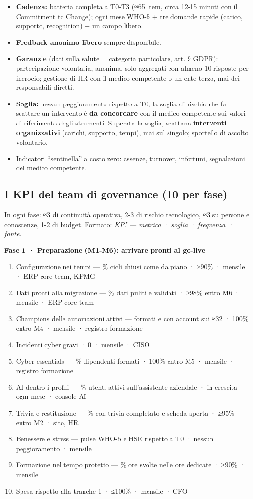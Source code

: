 \documentclass[11pt,a4paper]{article}
\begin{document}
\begin{itemize}
\item \textbf{Cadenza:} batteria completa a T0-T3 (≈65 item, circa 12-15 minuti con il Commitment to Change); ogni mese WHO-5 + tre domande rapide (carico, supporto, recognition) + un campo libero.
\item \textbf{Feedback anonimo libero} sempre disponibile.
\item \textbf{Garanzie} (dati sulla salute = categoria particolare, art. 9 GDPR): partecipazione volontaria, anonima, solo aggregati con almeno 10 risposte per incrocio; gestione di HR con il medico competente o un ente terzo, mai dei responsabili diretti.
\item \textbf{Soglia:} nessun peggioramento rispetto a T0; la soglia di rischio che fa scattare un intervento è \textbf{da concordare} con il medico competente sui valori di riferimento degli strumenti. Superata la soglia, scattano \textbf{interventi organizzativi} (carichi, supporto, tempi), mai sul singolo; sportello di ascolto volontario.
\item Indicatori ``sentinella'' a costo zero: assenze, turnover, infortuni, segnalazioni del medico competente.
\end{itemize}

\subsection{I KPI del team di governance (10 per fase)}\label{sec:16.4}
In ogni fase: ≈3 di continuità operativa, 2-3 di rischio tecnologico, ≈3 su persone e conoscenze, 1-2 di budget. Formato: \emph{KPI — metrica · soglia · frequenza · fonte}.

\textbf{Fase 1 · Preparazione (M1-M6): arrivare pronti al go-live}
\begin{enumerate}
\item Configurazione nei tempi — \% cicli chiusi come da piano · ≥90\% · mensile · ERP core team, KPMG
\item Dati pronti alla migrazione — \% dati puliti e validati · ≥98\% entro M6 · mensile · ERP core team
\item Champions delle automazioni attivi — formati e con account sui ≈32 · 100\% entro M4 · mensile · registro formazione
\item Incidenti cyber gravi · 0 · mensile · CISO
\item Cyber essentials — \% dipendenti formati · 100\% entro M5 · mensile · registro formazione
\item AI dentro i profili — \% utenti attivi sull'assistente aziendale · in crescita ogni mese · console AI
\item Trivia e restituzione — \% con trivia completato e scheda aperta · ≥95\% entro M2 · sito, HR
\item Benessere e stress — pulse WHO-5 e HSE rispetto a T0 · nessun peggioramento · mensile
\item Formazione nel tempo protetto — \% ore svolte nelle ore dedicate · ≥90\% · mensile
\item Spesa rispetto alla tranche 1 · ≤100\% · mensile · CFO
\end{enumerate}
\end{document}
